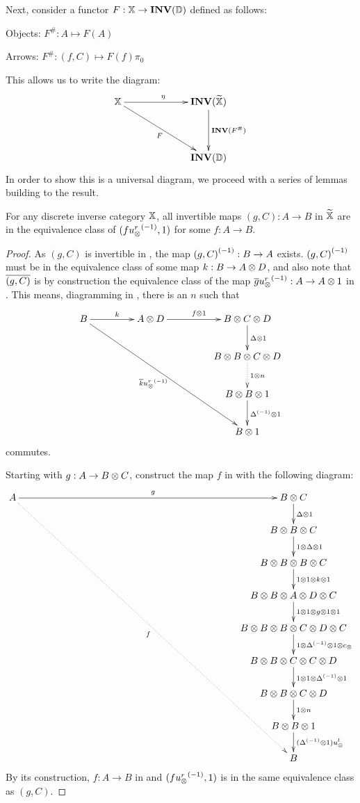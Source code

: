 Next, consider a functor $F:\mathbb{X} \to \mathbf{INV}({\mathbb{D}})$ defined as follows:
\begin{description}
  \item{Objects:} $F^{\#}:A \mapsto F(A)$
  \item{Arrows:} $F^{\#}:(f,C) \mapsto F(f)\pi_0$
\end{description}

This allows us to write the diagram:
\begin{equation}
  \xymatrix @C=65pt @R=40pt{
    \X \ar[r]^{\eta} \ar[rd]_{F}& \Inv{\Xt} \ar[d]^{\Inv{F^{\#}}}\\
    &\Inv{\D}
  }
  \label{dia:universal_property_of_inverse_categories}
\end{equation}
In order to show this is a universal diagram, we proceed with a series of lemmas building to the
result.

\begin{lemma}\label{lem:all_invertible_maps_in_xt_are_of_the_form_f_inv_usr}
  For any discrete inverse category $\mathbb{X}$, all invertible maps $(g,C):A\to B$ in $\widetilde{\mathbb{X}}$ are in the
  equivalence class of $(f {u_{\otimes}^r}^{(-1)},1)$ for some $f:A\to B$.
\end{lemma}
\begin{proof}
  As $(g,C)$ is invertible in \Xt, the map ${(g,C)}^{(-1)}: B \to A$ exists. ${(g,C)}^{(-1)}$ must be in
  the equivalence class of some map $k:B \to A \otimes D$, and also note that $\overline{(g,C)}$ is by
  construction the equivalence class of the map $\overline{g}{u_{\otimes}^r}^{(-1)}:A \to A\otimes1$ in \X. This means,
  diagramming in \X, there is an $n$ such that
  \[
    \xymatrix @C=45pt @R=25pt{
      B \ar[r]^{k} \ar[rrddd]_{\rst{k}\inv{\usr}}
        & A \*D \ar[r]^{f\*1}&B\*C\*D \ar[d]^{\Delta\*1}\\
      & &  B\*B\*C\*D \ar@{.>}[d]^{1\* n} \\
      & &  B\*B\*1 \ar[d]^{\inv{\Delta}\* 1}\\
      && B\* 1
    }
  \]
  commutes.

  Starting with $g:A\to B\otimes C$, construct the map $f$ in \X with the following diagram:
  \[
    \xymatrix @C=225pt @R=20pt{
      A \ar[r]^{g} \ar@{.>}[rdddddddd]_{f}& B \*C \ar[d]^{\Delta\*1}\\
      &B\*B\*C \ar[d]^{1\*\Delta\*1}\\
      &B\*B\*B\*C \ar[d]^{1\*1\*k\*1}\\
      &B\*B\*A\*D\*C \ar[d]^{1\*1\*g\*1\*1}\\
      &B\*B\*B\*C\*D\*C \ar[d]^{1\*\inv{\Delta}\*1\*c_{\*}}\\
      &B\*B\*C\*C\*D \ar[d]^{1\*1\*\inv{\Delta}\*1}\\
      &B\*B\*C\*D \ar[d]^{1\*n}\\
      &B\*B\*1 \ar[d]^{(\inv{\Delta}\* 1) \usl }\\
      &B
    }
  \]
  By its construction, $f:A\to B$ in \X and $(f{u_{\otimes}^r}^{(-1)},1)$ is in the same equivalence class as
  $(g,C)$.

\end{proof}

